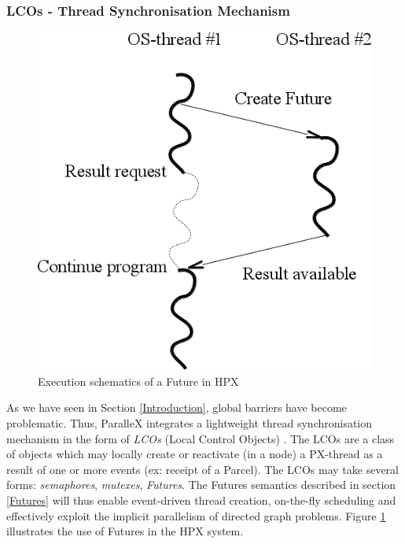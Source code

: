 \documentclass[smallextended]{svjour3}
\begin{document}
\subsubsection{LCOs - Thread Synchronisation Mechanism}\label{lcos}

\begin{figure}[h]
\begin{center}
\includegraphics[scale=0.4]{Images/Im5.png}
\end{center}
\caption{Execution schematics of a Future in HPX}
\label{hpxthread}
\end{figure}

As we have seen in Section \ref{Introduction}, global barriers have become problematic. Thus, ParalleX integrates a lightweight thread synchronisation
mechanism in the form of \emph{LCOs} (Local Control Objects) \cite{ParalleX}. The LCOs are a class of objects which may locally create or reactivate (in a node) a PX-thread as a result of one or more events (ex: receipt of a Parcel). The LCOs may take several forms: \emph{semaphores}, \emph{mutexes}, \emph{Futures}. The Futures semantics described in section \ref{Futures} will thus enable event-driven thread creation, on-the-fly scheduling and effectively exploit the implicit parallelism of directed graph problems. Figure \ref{hpxthread} illustrates the use of Futures in the HPX system.
\end{document}

